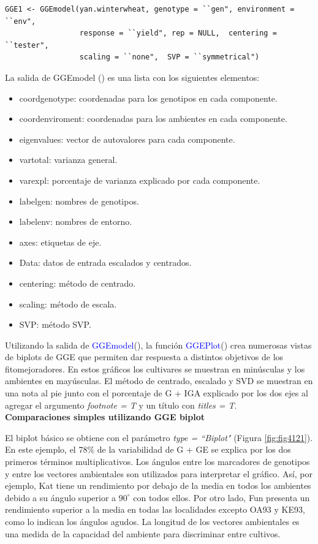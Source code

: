 \begin{tcolorbox}[colframe=aurometalsaurus,colback=backcolour,colbacklower=white,
   				width=1\linewidth,
    			height=0.12\linewidth,
    			boxsep=-3mm]
\begin{lstlisting}
GGE1 <- GGEmodel(yan.winterwheat, genotype = ``gen", environment = ``env", 
                 response = ``yield", rep = NULL,  centering = ``tester",
  				 scaling = ``none",  SVP = ``symmetrical")
\end{lstlisting}
\end{tcolorbox}


La salida de GGEmodel () es una lista con los siguientes elementos:
\begin{itemize}
\item coordgenotype: coordenadas para los genotipos en cada componente.
\item coordenviroment: coordenadas para los ambientes en cada componente.
\item eigenvalues: vector de autovalores para cada componente.
\item vartotal: varianza general.
\item varexpl: porcentaje de varianza explicado por cada componente.
\item labelgen: nombres de genotipos.
\item labelenv: nombres de entorno.
\item axes: etiquetas de eje.
\item Data: datos de entrada escalados y centrados.
\item centering: método de centrado.
\item scaling: método de escala.
\item SVP: método SVP. 
\end{itemize}


Utilizando la salida de \textcolor{blue}{GGEmodel}(), la función 
\textcolor{blue}{GGEPlot}() crea numerosas vistas de biplots de GGE que permiten dar respuesta a distintos objetivos de los fitomejoradores. En estos gráficos los cultivares se muestran en minúsculas y los ambientes en mayúsculas. El método de centrado, escalado y SVD se muestran en una nota al pie junto con el porcentaje de G + IGA explicado por los dos ejes al agregar el argumento \emph{footnote = T} y un título con \emph{titles = T}. \\

\textbf{Comparaciones simples utilizando GGE biplot}

El biplot básico se obtiene con el parámetro \emph{type = ``Biplot"} (Figura \ref{fig:fig4121}). En este ejemplo, el 78\% de la variabilidad de G + GE se explica por los dos primeros términos multiplicativos. Los ángulos entre los marcadores de genotipos y entre los vectores ambientales son utilizados para interpretar el gráfico. Así, por ejemplo, Kat tiene un rendimiento por debajo de la media en todos los ambientes debido a su ángulo superior a $90^{\circ}$ con todos ellos. Por otro lado, Fun presenta un rendimiento superior a la media en todas las localidades excepto OA93 y KE93, como lo indican los ángulos agudos. La longitud de los vectores ambientales es una medida de la capacidad del ambiente para discriminar entre cultivos. 


